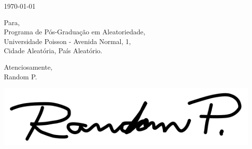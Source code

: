 \documentclass[
10pt, %
a4paper, %
oneside, %
footinclude, %
BCOR5mm, %
]{scrartcl}
\title{\normalfont\fontsize{20}{10}\selectfont \spacedlowsmallcaps{Random Person}} %
\subtitle{Endereço Aleatório\\Cidade Aleatória, Estado Aleatório\\\href{mailto:random.person@randomdomain.br}{random.person@randomdomain.br} } %
\date{} %
\newcommand{\ToAddr}[1]{\noindent Para,\\ #1}
\newcommand{\LetterDate}[1]{\noindent#1\par\vspace{2em}}
\newcommand{\Sign}[1]{\vspace{2em}\noindent Atenciosamente,\\ #1\par\vspace{0.5em}}
\begin{document}
\maketitle %

\vspace{-4em}

\LetterDate{\today}
\vspace{-0.8em}
\ToAddr{Programa de Pós-Graduação em Aleatoriedade,\\Universidade Poisson - Avenida Normal, 1,\\ Cidade Aleatória, País Aleatório.\\}

\lipsum[1-3]

\Sign{Random P.}
\noindent\includegraphics[scale=0.2]{random-person.png}


%

\end{document}
